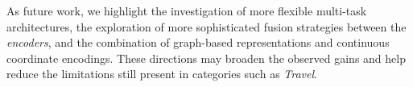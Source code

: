 As future work, we highlight the investigation of more flexible multi-task architectures, the exploration of more sophisticated fusion strategies between the \textit{encoders}, and the combination of graph-based representations and continuous coordinate encodings. These directions may broaden the observed gains and help reduce the limitations still present in categories such as \textit{Travel}.

